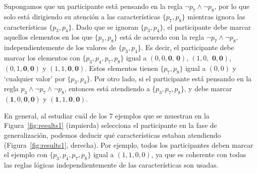 Supongamos que un participante está pensando en la regla $ \lnot p_7 \land \lnot p_8 $, por lo que solo está dirigiendo su atención a las características $ \{p_7, p_8 \} $ mientras ignora las características $ \{p_3, p_4 \} $. Dado que se ignoran $ \{p_3, p_4 \} $, el participante debe marcar aquellos elementos en los que $ \{p_7, p_8 \} $ está de acuerdo con la regla $ \lnot p_7 \land \lnot p_8 $, independientemente de los valores de $ \{p_3, p_4 \} $. Es decir, el participante debe marcar los elementos con $ \{p_3, p_4, p_7, p_8 \} $ igual a $ (0,0, \textbf {0, 0}) $, $ (1,0, \textbf { 0}, \textbf {0}) $, $ (0,1, \textbf {0}, \textbf {0}) $ y $ (1,1, \textbf {0}, \textbf {0}) $. Estos elementos tienen $ \{p_7, p_8 \} $ igual a $ (0,0) $ y `cualquier valor' por $ \{p_3, p_4 \} $. Por otro lado, si el participante está pensando en la regla $ p_3 \land \lnot p_7 \land \lnot p_8 $, entonces está atendiendo a $ \{p_3, p_7, p_8 \} $, y debe marcar $ ( \textbf {1}, 0, \textbf {0}, \textbf {0}) $ y $ (\textbf {1}, 1, \textbf {0}, \textbf {0}) $.

En general, al estudiar cuál de los 7 ejemplos que se muestran en la Figura~\ref{fig:results1} (izquierda) selecciona el participante en la fase de generalización, podemos deducir qué características estaban atendiendo (Figura~\ref{fig:results1}, derecha). Por ejemplo, todos los participantes deben marcar el ejemplo con $ \{p_3, p_4, p_7, p_8 \} $ igual a $ (1,1,0,0) $, ya que es coherente con todas las reglas lógicas independientemente de las características son usadas.

